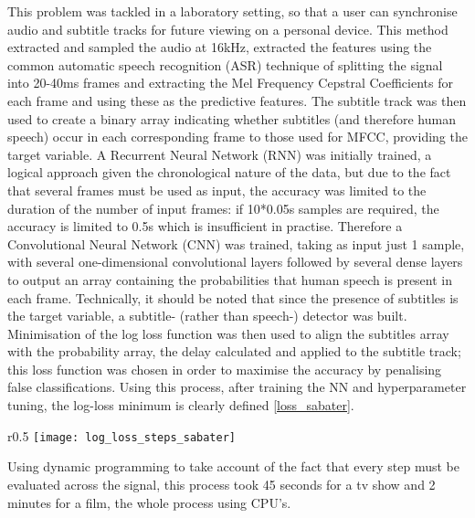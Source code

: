 This problem was tackled in a laboratory setting\cite{Sabater_2017}, so that a user can synchronise audio and subtitle tracks for future viewing on a personal device. This method extracted and sampled the audio at 16kHz, extracted the features using the common automatic speech recognition (ASR) technique of splitting the signal into 20-40ms frames and extracting the Mel Frequency Cepstral Coefficients for each frame and using these as the predictive features. The subtitle track was then used to create a binary array indicating whether subtitles (and therefore human speech) occur in each corresponding frame to those used for MFCC, providing the target variable. A Recurrent Neural Network (RNN) was initially trained, a logical approach given the chronological nature of the data, but due to the fact that several frames must be used as input, the accuracy was limited to the duration of the number of input frames: if 10*0.05s samples are required, the accuracy is limited to 0.5s which is insufficient in practise. Therefore a Convolutional Neural Network (CNN) was trained, taking as input just 1 sample, with several one-dimensional convolutional layers followed by several dense layers to output an array containing the probabilities that human speech is present in each frame. Technically, it should be noted that since the presence of subtitles is the target variable, a subtitle- (rather than speech-) detector was built. Minimisation of the log loss function was then used to align the subtitles array with the probability array, the delay calculated and applied to the subtitle track; this loss function was chosen in order to maximise the accuracy by penalising false classifications. Using this process, after training the NN and hyperparameter tuning, the log-loss minimum is clearly defined \ref{loss_sabater}.
\begin{wrapfigure}{r}{0.5\textwidth} 
	\texttt{[image: log\_loss\_steps\_sabater]}
	\caption{Log loss plot when matching full audio to full subtitles}
	\label{loss_sabater}
\end{wrapfigure}
Using dynamic programming to take account of the fact that every step must be evaluated across the signal, this process took 45 seconds for a tv show and 2 minutes for a film, the whole process using CPU’s. 
